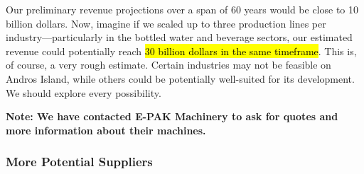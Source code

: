 \documentclass{article}
\begin{document}
Our preliminary revenue projections over a span of 60 years would be close to 10 billion dollars. Now, imagine if we scaled up to three production lines per industry—particularly in the bottled water and beverage sectors, our estimated revenue could potentially reach \hl{30 billion dollars in the same timeframe}. This is, of course, a very rough estimate. Certain industries may not be feasible on Andros Island, while others could be potentially well-suited for its development. We should explore every possibility.\par
\textbf{Note: We have contacted E-PAK Machinery to ask for quotes and more information about their machines.}

\subsubsection{More Potential Suppliers}
\end{document}
